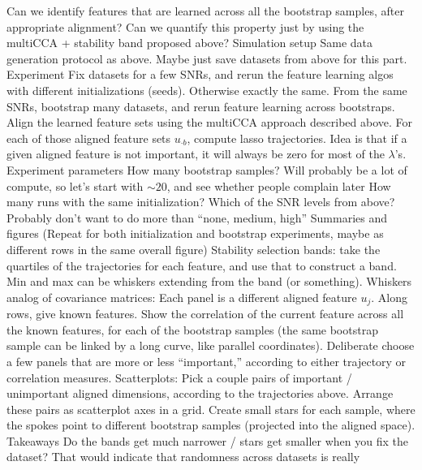 \documentclass[11pt]{article}
\begin{document}
\begin{outline}
      \3 Can we identify features that are learned across all the bootstrap
      samples, after appropriate alignment? Can we quantify this property just
      by using the multiCCA + stability band proposed above?
    \2 Simulation setup
      \3 Same data generation protocol as above. Maybe just save datasets from
      above for this part.
      \3 Experiment
        \4 Fix datasets for a few SNRs, and rerun the feature learning algos
        with different initializations (seeds). Otherwise exactly the same.
        \4 From the same SNRs, bootstrap many datasets, and rerun feature
        learning across bootstraps.
        \4 Align the learned feature sets using the multiCCA approach described
        above. For each of those aligned feature sets $u_{\cdot b}$, compute
        lasso trajectories. Idea is that if a given aligned feature is not
        important, it will always be zero for most of the $\lambda$'s.
      \3 Experiment parameters
        \4 How many bootstrap samples? Will probably be a lot of compute, so
        let's start with $\sim 20$, and see whether people complain later
        \4 How many runs with the same initialization?
        \4 Which of the SNR levels from above? Probably don't want to do more
        than ``none, medium, high''
      \3 Summaries and figures
        \4 (Repeat for both initialization and bootstrap experiments, maybe as
        different rows in the same overall figure)
        \4 Stability selection bands: take the quartiles of the trajectories for
        each feature, and use that to construct a band. Min and max can be
        whiskers extending from the band (or something).
        \4 Whiskers analog of covariance matrices: Each panel is a different
        aligned feature $u_{j}$. Along rows, give known features. Show the
        correlation of the current feature across all the known features, for
        each of the bootstrap samples (the same bootstrap sample can be linked
        by a long curve, like parallel coordinates). Deliberate choose a few
        panels that are more or less ``important,'' according to either
        trajectory or correlation measures.
        \4 Scatterplots: Pick a couple pairs of important / unimportant aligned
        dimensions, according to the trajectories above. Arrange these pairs as
        scatterplot axes in a grid. Create small stars for each sample, where
        the spokes point to different bootstrap samples (projected into the
        aligned space).
      \3 Takeaways
        \4 Do the bands get much narrower / stars get smaller when you fix the
        dataset? That would indicate that randomness across datasets is really

\end{outline}
\end{document}
